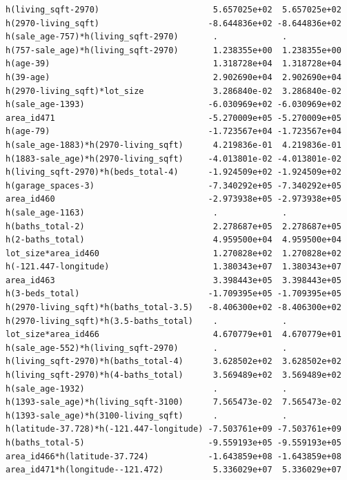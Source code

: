 \documentclass[
]{article}
\begin{document}
\begin{verbatim}
h(living_sqft-2970)                       5.657025e+02  5.657025e+02
h(2970-living_sqft)                      -8.644836e+02 -8.644836e+02
h(sale_age-757)*h(living_sqft-2970)       .             .           
h(757-sale_age)*h(living_sqft-2970)       1.238355e+00  1.238355e+00
h(age-39)                                 1.318728e+04  1.318728e+04
h(39-age)                                 2.902690e+04  2.902690e+04
h(2970-living_sqft)*lot_size              3.286840e-02  3.286840e-02
h(sale_age-1393)                         -6.030969e+02 -6.030969e+02
area_id471                               -5.270009e+05 -5.270009e+05
h(age-79)                                -1.723567e+04 -1.723567e+04
h(sale_age-1883)*h(2970-living_sqft)      4.219836e-01  4.219836e-01
h(1883-sale_age)*h(2970-living_sqft)     -4.013801e-02 -4.013801e-02
h(living_sqft-2970)*h(beds_total-4)      -1.924509e+02 -1.924509e+02
h(garage_spaces-3)                       -7.340292e+05 -7.340292e+05
area_id460                               -2.973938e+05 -2.973938e+05
h(sale_age-1163)                          .             .           
h(baths_total-2)                          2.278687e+05  2.278687e+05
h(2-baths_total)                          4.959500e+04  4.959500e+04
lot_size*area_id460                       1.270828e+02  1.270828e+02
h(-121.447-longitude)                     1.380343e+07  1.380343e+07
area_id463                                3.398443e+05  3.398443e+05
h(3-beds_total)                          -1.709395e+05 -1.709395e+05
h(2970-living_sqft)*h(baths_total-3.5)   -8.406300e+02 -8.406300e+02
h(2970-living_sqft)*h(3.5-baths_total)    .             .           
lot_size*area_id466                       4.670779e+01  4.670779e+01
h(sale_age-552)*h(living_sqft-2970)       .             .           
h(living_sqft-2970)*h(baths_total-4)      3.628502e+02  3.628502e+02
h(living_sqft-2970)*h(4-baths_total)      3.569489e+02  3.569489e+02
h(sale_age-1932)                          .             .           
h(1393-sale_age)*h(living_sqft-3100)      7.565473e-02  7.565473e-02
h(1393-sale_age)*h(3100-living_sqft)      .             .           
h(latitude-37.728)*h(-121.447-longitude) -7.503761e+09 -7.503761e+09
h(baths_total-5)                         -9.559193e+05 -9.559193e+05
area_id466*h(latitude-37.724)            -1.643859e+08 -1.643859e+08
area_id471*h(longitude--121.472)          5.336029e+07  5.336029e+07
                                                                    

\end{verbatim}
\end{document}
